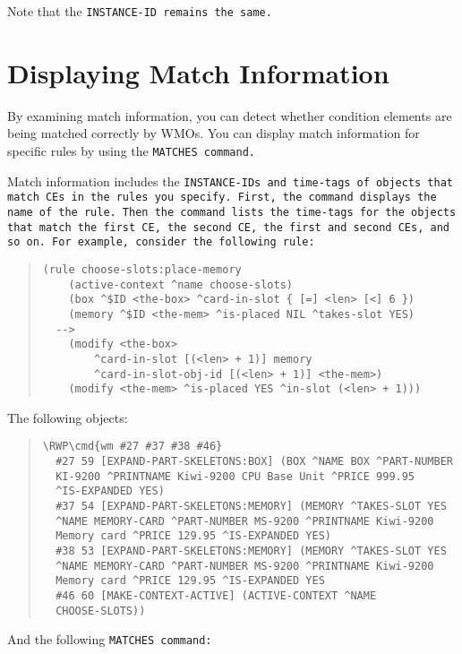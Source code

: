 Note that the \tt{INSTANCE-ID} remains the same.

\section{Displaying Match Information}

By examining match information, you can detect whether condition
elements are being matched correctly by WMOs. You can display match
information for specific rules by using the \tt{MATCHES} command.

Match information includes the \tt{INSTANCE-ID}s and time-tags of
objects that match CEs in the rules you specify. First, the command
displays the name of the rule. Then the command lists the time-tags
for the objects that match the first CE, the second CE, the first and
second CEs, and so on. For example, consider the following rule:

\begin{quote}
\begin{verbatim}
(rule choose-slots:place-memory
    (active-context ^name choose-slots)
    (box ^$ID <the-box> ^card-in-slot { [=] <len> [<] 6 })
    (memory ^$ID <the-mem> ^is-placed NIL ^takes-slot YES)
  -->
    (modify <the-box>
        ^card-in-slot [(<len> + 1)] memory
        ^card-in-slot-obj-id [(<len> + 1)] <the-mem>)
    (modify <the-mem> ^is-placed YES ^in-slot (<len> + 1)))
\end{verbatim}
\end{quote}

The following objects:

\begin{quote}
\begin{Verbatim}[commandchars=\\\{\}]
\RWP\cmd{wm #27 #37 #38 #46}
  #27 59 [EXPAND-PART-SKELETONS:BOX] (BOX ^NAME BOX ^PART-NUMBER
  KI-9200 ^PRINTNAME Kiwi-9200 CPU Base Unit ^PRICE 999.95
  ^IS-EXPANDED YES)
  #37 54 [EXPAND-PART-SKELETONS:MEMORY] (MEMORY ^TAKES-SLOT YES
  ^NAME MEMORY-CARD ^PART-NUMBER MS-9200 ^PRINTNAME Kiwi-9200
  Memory card ^PRICE 129.95 ^IS-EXPANDED YES)
  #38 53 [EXPAND-PART-SKELETONS:MEMORY] (MEMORY ^TAKES-SLOT YES
  ^NAME MEMORY-CARD ^PART-NUMBER MS-9200 ^PRINTNAME Kiwi-9200
  Memory card ^PRICE 129.95 ^IS-EXPANDED YES
  #46 60 [MAKE-CONTEXT-ACTIVE] (ACTIVE-CONTEXT ^NAME
  CHOOSE-SLOTS))
\end{Verbatim}
\end{quote}

And the following \tt{MATCHES} command:

